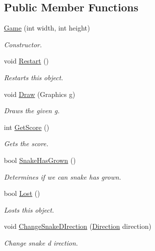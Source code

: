 \subsection*{Public Member Functions}
\begin{DoxyCompactItemize}
\item 
\mbox{\hyperlink{class_snake_1_1_game_a16b91396b858683bbf27177137e660da}{Game}} (int width, int height)
\begin{DoxyCompactList}\small\item\em Constructor. \end{DoxyCompactList}\item 
void \mbox{\hyperlink{class_snake_1_1_game_ae3bcefb730cb41ecfc315da121687315}{Restart}} ()
\begin{DoxyCompactList}\small\item\em Restarts this object. \end{DoxyCompactList}\item 
void \mbox{\hyperlink{class_snake_1_1_game_ada55759091b780f152f7e4c362888ae2}{Draw}} (Graphics g)
\begin{DoxyCompactList}\small\item\em Draws the given g. \end{DoxyCompactList}\item 
int \mbox{\hyperlink{class_snake_1_1_game_a55372fdb6c0351cca92351c5d622a9e0}{Get\+Score}} ()
\begin{DoxyCompactList}\small\item\em Gets the score. \end{DoxyCompactList}\item 
bool \mbox{\hyperlink{class_snake_1_1_game_a923f13e9e2c28d914b83cf28fcb2c7a3}{Snake\+Has\+Grown}} ()
\begin{DoxyCompactList}\small\item\em Determines if we can snake has grown. \end{DoxyCompactList}\item 
bool \mbox{\hyperlink{class_snake_1_1_game_ae1c3c7687934689be99f9894c609b5cb}{Lost}} ()
\begin{DoxyCompactList}\small\item\em Losts this object. \end{DoxyCompactList}\item 
void \mbox{\hyperlink{class_snake_1_1_game_ab7a178dc4a0dfa1af089aecc944fa209}{Change\+Snake\+D\+Irection}} (\mbox{\hyperlink{namespace_snake_a17196bbf1b4636022495ef12635a68f7}{Direction}} direction)
\begin{DoxyCompactList}\small\item\em Change snake d irection. \end{DoxyCompactList}\end{DoxyCompactItemize}
